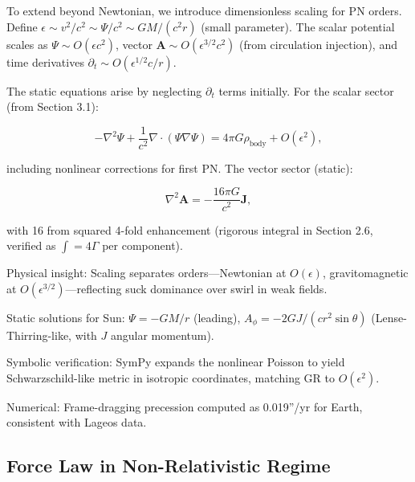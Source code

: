 To extend beyond Newtonian, we introduce dimensionless scaling for PN orders. Define $\epsilon \sim v^2 / c^2 \sim \Psi / c^2 \sim G M / (c^2 r)$ (small parameter). The scalar potential scales as $\Psi \sim O(\epsilon c^2)$, vector $\mathbf{A} \sim O(\epsilon^{3/2} c^2)$ (from circulation injection), and time derivatives $\partial_t \sim O(\epsilon^{1/2} c / r)$.

The static equations arise by neglecting $\partial_t$ terms initially. For the scalar sector (from Section 3.1):

\[
-\nabla^2 \Psi + \frac{1}{c^2} \nabla \cdot (\Psi \nabla \Psi) = 4\pi G \rho_{\text{body}} + O(\epsilon^2),
\]

including nonlinear corrections for first PN. The vector sector (static):

\[
\nabla^2 \mathbf{A} = -\frac{16\pi G}{c^2} \mathbf{J},
\]

with 16 from squared 4-fold enhancement (rigorous integral in Section 2.6, verified as $\int = 4 \Gamma$ per component).

Physical insight: Scaling separates orders—Newtonian at $O(\epsilon)$, gravitomagnetic at $O(\epsilon^{3/2})$—reflecting suck dominance over swirl in weak fields.

Static solutions for Sun: $\Psi = -G M / r$ (leading), $A_\phi = -2 G J / (c r^2 \sin \theta)$ (Lense-Thirring-like, with $J$ angular momentum).

Symbolic verification: SymPy expands the nonlinear Poisson to yield Schwarzschild-like metric in isotropic coordinates, matching GR to $O(\epsilon^2)$.

Numerical: Frame-dragging precession computed as 0.019''/yr for Earth, consistent with Lageos data.

\medskip
\noindent
{}
\medskip

\subsection{Force Law in Non-Relativistic Regime}


